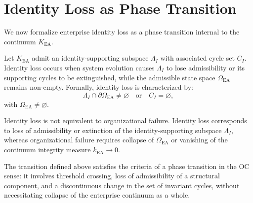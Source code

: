 ﻿\section{Identity Loss as Phase Transition}

We now formalize enterprise identity loss as a phase transition internal to
the continuum $K_{\mathrm{EA}}$.

\begin{theorem}
Let $K_{\mathrm{EA}}$ admit an identity-supporting subspace $\Lambda_I$ with
associated cycle set $C_I$. Identity loss occurs when system evolution causes
$\Lambda_I$ to lose admissibility or its supporting cycles to be extinguished,
while the admissible state space $\Omega_{\mathrm{EA}}$ remains non-empty.
Formally, identity loss is characterized by:
\[
\Lambda_I \cap \partial\Omega_{\mathrm{EA}} \neq \varnothing
\quad \text{or} \quad
C_I = \varnothing,
\]
with $\Omega_{\mathrm{EA}} \neq \varnothing$.
\end{theorem}

\begin{proposition}
Identity loss is not equivalent to organizational failure. Identity loss
corresponds to loss of admissibility or extinction of the identity-supporting
subspace $\Lambda_I$, whereas organizational failure requires collapse of
$\Omega_{\mathrm{EA}}$ or vanishing of the continuum integrity measure
$k_{\mathrm{EA}} \rightarrow 0$.
\end{proposition}

The transition defined above satisfies the criteria of a phase transition in the
OC sense: it involves threshold crossing, loss of admissibility of a structural
component, and a discontinuous change in the set of invariant cycles, without
necessitating collapse of the enterprise continuum as a whole.
